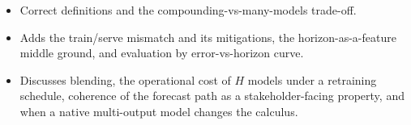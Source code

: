 \begin{interviewq}

\goodgreat
\begin{itemize}
    \item {} Correct definitions and the compounding-vs-many-models trade-off.
    \item {} Adds the train/serve mismatch and its mitigations, the horizon-as-a-feature middle ground, and evaluation by error-vs-horizon curve.
    \item {} Discusses blending, the operational cost of $H$ models under a retraining schedule, coherence of the forecast path as a stakeholder-facing property, and when a native multi-output model changes the calculus.
\end{itemize}

\end{interviewq}

